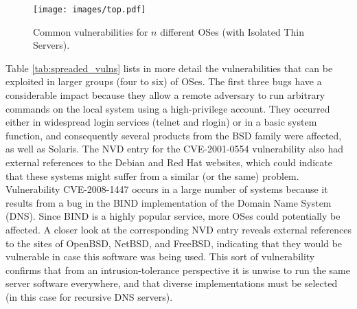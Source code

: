 \begin{figure}[!ht]
 \centering
 \texttt{[image: images/top.pdf]}
 \caption{Common vulnerabilities for $n$ different OSes (with Isolated Thin Servers).}
 \label{top}
\end{figure}


Table \ref{tab:spreaded_vulns} lists in more detail the vulnerabilities that can be exploited in larger groups (four to six) of OSes. The first three bugs have a considerable impact because they allow a remote adversary to run arbitrary commands on the local system using a high-privilege account. They occurred either in widespread login services (telnet and rlogin) or in a basic system function, and consequently several products from the BSD family were affected, as well as Solaris. The NVD entry for the CVE-2001-0554 vulnerability also had external references to the Debian and Red Hat websites, which could indicate that these systems might suffer from a similar (or the same) problem. Vulnerability CVE-2008-1447 occurs in a large number of systems because it results from a bug in the BIND implementation of the Domain Name System (DNS). Since BIND is a highly popular service, more OSes could potentially be affected. A closer look at the corresponding NVD entry reveals external references to the sites of OpenBSD, NetBSD, and FreeBSD, indicating that they would be vulnerable in case this software was being used. This sort of vulnerability confirms that from an intrusion-tolerance perspective it is unwise to run the same server software everywhere, and that diverse implementations must be selected (in this case for recursive DNS servers).

